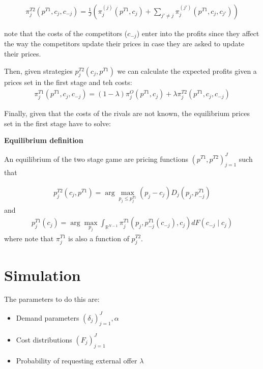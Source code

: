 \documentclass[12pt]{article}
\begin{document}
\begin{align}\label{eq:profits_external2} %
    \pi_j^{T2}(p^{T1}, c_j, c_{-j}) =  \frac{1}{J} \left( \pi_j^{(j)}(p^{T1}, c_j)   + \sum_{j'\neq j} \pi_j^{(j')}(p^{T1}, c_j, c_{j'}) \right)
\end{align}


note that the costs of the competitors ($c_{-j}$) enter into the profits since they affect the way the competitors update their prices in case they are asked to update their prices.

Then, given strategies  $p_j^{T2}(c_j, p^{T1})$ we can calculate the expected profits given a prices set in the first stage and teh costs: 
\begin{align} %
    \pi_j^{T1}(p^{T1}, c_j, c_{-j}) = (1-\lambda) \pi_j^O(p^{T1}, c_j) + \lambda \pi_j^{T2}(p^{T1}, c_j, c_{-j})
\end{align}

Finally, given that the costs of the rivals are not known, the equilibrium prices set in the first stage have to solve: 


\textbf{Equilibrium definition}

An equilibrium of the two stage game are pricing functions $(p^{T1}, p^{T2})_{j=1}^J$ such that 


\begin{align}\label{eq:eq_second_stage} %
    p_j^{T2}(c_j, p^{T1}) = \arg \max_{p_j \leq p_j^{T1}} (p_j - c_j) D_j(p_j, p_{-j}^{T1}) 
\end{align}
and 
\begin{align}\label{eq:eq_first_stage} %
    p_j^{T1}(c_j) = \arg \max_{p_j} \int_{\mathbb{R}^{N-1}}^{}  \pi_j^{T1}(p_j, p_{-j}^{T1}(c_{-j}), c_j) dF(c_{-j} \mid c_j)   
\end{align}
where note that $\pi_j^{T1}$ is also a function of $p_j^{T2}$. 




 
\section{Simulation}
The parameters to do this are: 
\begin{itemize}
    \item Demand parameters $(\delta_j)_{j=1}^J, \alpha$
    \item Cost distributions $(F_j)_{j=1}^J$
    \item Probability of requesting external offer $\lambda$
\end{itemize}
\end{document}

